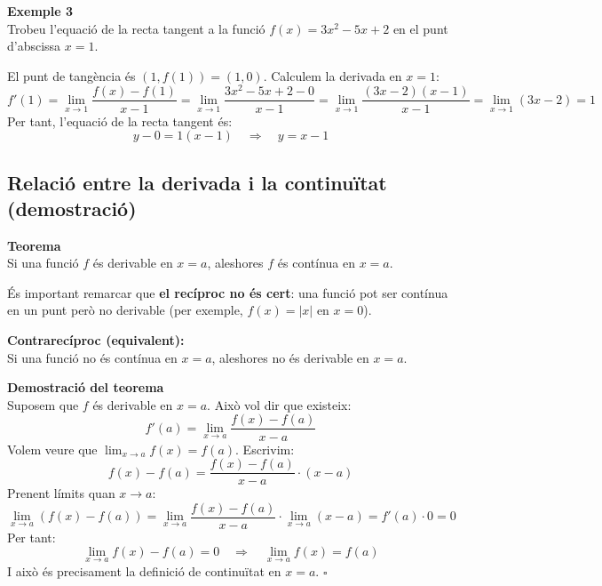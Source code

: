 \documentclass[12pt]{article}
\begin{document}
\begin{exemple}
\textbf{Exemple 3}\\
Trobeu l'equació de la recta tangent a la funció $f(x)=3x^2-5x+2$ en el punt d'abscissa $x=1$.

El punt de tangència és $(1,f(1))=(1,0)$. Calculem la derivada en $x=1$:
\[
f'(1)=\lim_{x\to 1} \frac{f(x)-f(1)}{x-1}
      =\lim_{x\to 1} \frac{3x^2-5x+2-0}{x-1}
      =\lim_{x\to 1} \frac{(3x-2)(x-1)}{x-1}
      =\lim_{x\to 1} (3x-2)=1
\]
Per tant, l'equació de la recta tangent és:
\[
y-0=1(x-1) \quad\Longrightarrow\quad \boxed{y=x-1}
\]
\end{exemple}


\subsection{Relació entre la derivada i la continuïtat (demostració)}

\begin{concept}
\textbf{Teorema}\\
Si una funció $f$ és derivable en $x=a$, aleshores $f$ és contínua en $x=a$.

És important remarcar que \textbf{el recíproc no és cert}: una funció pot ser contínua en un punt però no derivable (per exemple, $f(x)=|x|$ en $x=0$).

\textbf{Contrarecíproc (equivalent):}\\
Si una funció no és contínua en $x=a$, aleshores no és derivable en $x=a$.
\end{concept}

\begin{concept}
\textbf{Demostració del teorema}\\
Suposem que $f$ és derivable en $x=a$. Això vol dir que existeix:
\[
f'(a)=\lim_{x\to a} \frac{f(x)-f(a)}{x-a}
\]
Volem veure que $\lim_{x\to a} f(x)=f(a)$. Escrivim:
\[
f(x)-f(a)=\frac{f(x)-f(a)}{x-a}\cdot (x-a)
\]
Prenent límits quan $x\to a$:
\[
\lim_{x\to a} (f(x)-f(a))
=
\lim_{x\to a} \frac{f(x)-f(a)}{x-a}
\cdot
\lim_{x\to a} (x-a)
=
f'(a)\cdot 0 = 0
\]
Per tant:
\[
\lim_{x\to a} f(x)-f(a)=0
\quad\Longrightarrow\quad
\lim_{x\to a} f(x)=f(a)
\]
I això és precisament la definició de continuïtat en $x=a$. $\square$
\end{concept}
\end{document}
